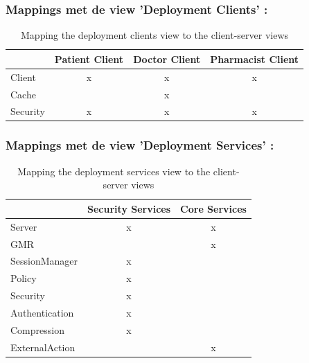 \documentclass[a4paper,10pt]{article}
\begin{document}
\subsubsection*{Mappings met de view 'Deployment Clients' : }
\begin{table}[h!]
\begin{center}
 \begin{tabular}{l| c | c | c |} 
 & Patient Client & Doctor Client & Pharmacist Client \\ \hline
Client & x & x & x \\ \hline
\hspace{6pt}Cache & & x & \\ \hline
\hspace{6pt}Security & x & x & x \\ \hline
\end{tabular}
\caption{Mapping the deployment clients view to the client-server views}
\end{center}
\end{table}

\subsubsection*{Mappings met de view 'Deployment Services' : }
\begin{table}[h!]
\begin{center}
 \begin{tabular}{l| c | c |} 
 & Security Services & Core Services \\ \hline
Server & x & x \\ \hline
\hspace{6pt}GMR & & x \\ \hline
\hspace{6pt}SessionManager & x & \\ \hline
\hspace{6pt}Policy & x & \\ \hline
\hspace{6pt}Security & x & \\ \hline
\hspace{12pt}Authentication & x & \\ \hline
\hspace{12pt}Compression & x & \\ \hline
\hspace{6pt}ExternalAction & & x \\ \hline
\end{tabular}
\caption{Mapping the deployment services view to the client-server views}
\end{center}
\end{table}
\end{document}
